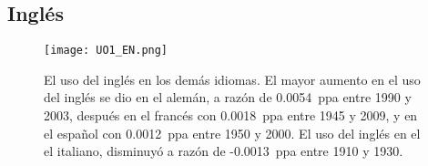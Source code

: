 




\subsection{Inglés} %

\begin{figure}[h!]
	\centering
	\texttt{[image: UO1\_EN.png]}
	\caption{El uso del inglés en los demás idiomas. El mayor aumento en el uso del inglés se dio en el alemán, a razón de 0.0054~ppa  entre 1990 y 2003, después en el francés con 0.0018~ppa entre 1945 y 2009, y en el español con 0.0012~ppa entre 1950 y 2000. El uso del inglés en el el italiano, disminuyó a razón de -0.0013~ppa entre 1910 y 1930.}
	\label{fig.UO_EN}
\end{figure} 

